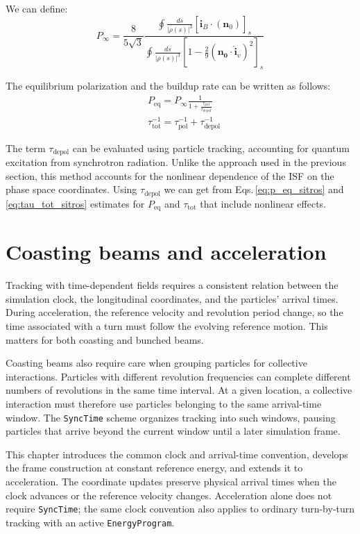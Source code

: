 We can define:
\begin{equation}
  P_{\infty} = \frac{8}{5\sqrt{3}}
  \frac
  {
   \oint \frac{ds}{|\rho(s)|^3}
    \left[\hat{\bm{i}}_B \cdot
    (\bm{n}_0)
    \right]_s
}
{
  \oint \frac{ds}{|\rho(s)|^3}
  \left[
    1 - \frac{2}{9} (\bm{n_0} \cdot \hat{\bm{i}}_v)^2
    \right]_s
}
\end{equation}

The equilibrium polarization and the buildup rate can be written as follows:
\begin{align}
  &P_\text{eq} = P_{\infty} \frac{1}{1 + \frac{\tau_\text{pol}}{\tau_\text{depol}}}
  \label{eq:p_eq_sitros}\\
  &\tau_\text{tot}^{-1} = \tau_\text{pol}^{-1} + \tau_\text{depol}^{-1}
  \label{eq:tau_tot_sitros}
\end{align}

The term $\tau_\text{depol}$ can be evaluated using particle tracking, accounting for
quantum excitation from synchrotron radiation. Unlike the approach used in the previous
section, this method accounts for the nonlinear dependence of the ISF on the phase space coordinates.
Using $\tau_\text{depol}$ we can get from Eqs.\,\ref{eq:p_eq_sitros} and \ref{eq:tau_tot_sitros}
estimates for $P_\text{eq}$ and $\tau_\text{tot}$ that include nonlinear effects.


\chapter{Coasting beams and acceleration}

Tracking with time-dependent fields requires a consistent relation between the
simulation clock, the longitudinal coordinates, and the particles' arrival
times. During acceleration, the reference velocity and revolution period
change, so the time associated with a turn must follow the evolving reference
motion. This matters for both coasting and bunched beams.

Coasting beams also require care when grouping particles for collective
interactions. Particles with different revolution frequencies can complete
different numbers of revolutions in the same time interval. At a given
location, a collective interaction must therefore use particles belonging to
the same arrival-time window. The \texttt{SyncTime} scheme organizes tracking
into such windows, pausing particles that arrive beyond the current window
until a later simulation frame.

This chapter introduces the common clock and arrival-time convention, develops
the frame construction at constant reference energy, and extends it to
acceleration. The coordinate updates preserve physical arrival times when the
clock advances or the reference velocity changes. Acceleration alone does not
require \texttt{SyncTime}; the same clock convention also applies to ordinary
turn-by-turn tracking with an active \texttt{EnergyProgram}.

